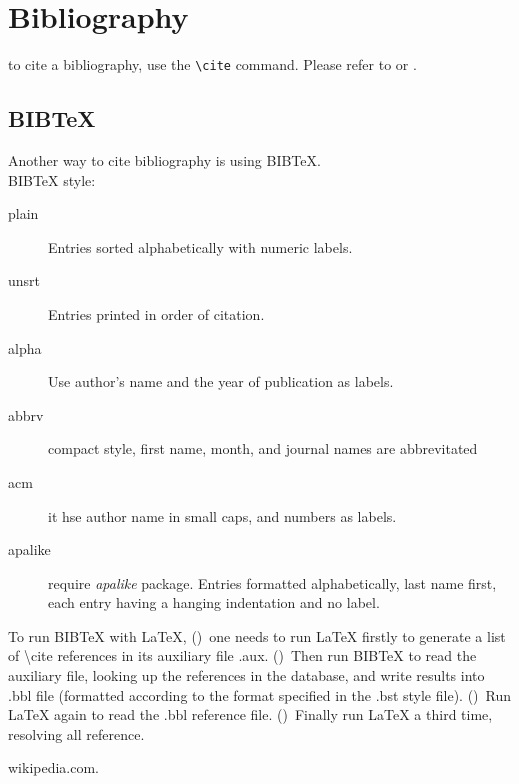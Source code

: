\section{Bibliography}
to cite a bibliography, use the \verb|\cite| command. 
Please refer to \cite{wiki} or \cite[option]{wiki}.

\subsection{BIBTeX}
Another way to cite bibliography is using BIBTeX. \\
BIBTeX style:
\begin{description}
    \item [plain] Entries sorted alphabetically with numeric labels.
    \item [unsrt] Entries printed in order of citation.
    \item [alpha] Use author's name and the year of publication as labels.
    \item [abbrv] compact style, first name, month, and journal names are
	abbrevitated
    \item [acm]	it hse author name in small caps, and numbers as labels.
    \item [apalike] require \emph{apalike} package. Entries formatted
	alphabetically, last name first, each entry having a hanging
	indentation and no label.
\end{description}

To run BIBTeX with \LaTeX{}, ()\  one needs to run \LaTeX{} firstly to
generate a list of \textbackslash{}cite references in its auxiliary file
.aux. ()\  Then run BIBTeX to read the auxiliary file, looking up the references
in the database, and write results into .bbl file (formatted according to
the format specified in the .bst style file). ()\  Run \LaTeX{} again to read the
.bbl reference file. ()\  Finally run \LaTeX{} a third time, resolving all
reference. 

\begin{thebibliography}{9}
    wikipedia.com.
\end{thebibliography}

